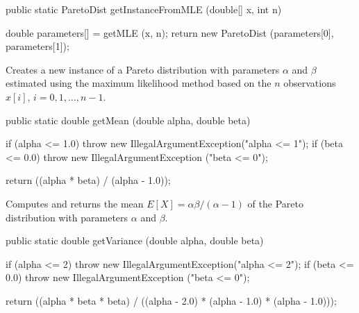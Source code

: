 \begin{htmlonly}
\end{htmlonly}
\begin{code}

   public static ParetoDist getInstanceFromMLE (double[] x, int n)\begin{hide} {
      double parameters[] = getMLE (x, n);
      return new ParetoDist (parameters[0], parameters[1]);
   }\end{hide}
\end{code}
\begin{tabb}
   Creates a new instance of a Pareto distribution with parameters $\alpha$ and $\beta$
   estimated using the maximum likelihood method based on the $n$ observations
   $x[i]$, $i = 0, 1, \ldots, n-1$.
\end{tabb}
\begin{htmlonly}
\end{htmlonly}
\begin{code}

   public static double getMean (double alpha, double beta)\begin{hide} {
      if (alpha <= 1.0)
         throw new IllegalArgumentException("alpha <= 1");
      if (beta <= 0.0)
        throw new IllegalArgumentException ("beta <= 0");

      return ((alpha * beta) / (alpha - 1.0));
   }\end{hide}
\end{code}
\begin{tabb}  Computes and returns the mean $E[X] = \alpha\beta/(\alpha - 1)$
   of the Pareto distribution with parameters $\alpha$ and $\beta$.
\end{tabb}
\begin{htmlonly}
\end{htmlonly}
\begin{code}

   public static double getVariance (double alpha, double beta)\begin{hide} {
      if (alpha <= 2)
         throw new IllegalArgumentException("alpha <= 2");
      if (beta <= 0.0)
        throw new IllegalArgumentException ("beta <= 0");

      return ((alpha * beta * beta) / ((alpha - 2.0) * (alpha - 1.0) * (alpha - 1.0)));
   }\end{hide}
\end{code}
